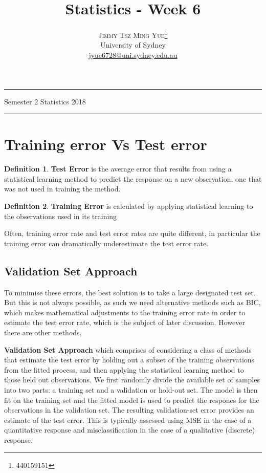 \documentclass[twoside]{article}
\title{\vspace{-15mm}\fontsize{24pt}{10pt}\selectfont\textbf{Statistics - Week 6}} %
\author{
\large
\textsc{Jimmy Tsz Ming Yue}\thanks{440159151}\\[2mm] %
\normalsize University of Sydney \\ %
\normalsize \href{mailto:jyue6728@uni.sydney.edu.au}{jyue6728@uni.sydney.edu.au} %
\vspace{-5mm}
}
\date{}
\theoremstyle{definition}
\theoremstyle{definition}
\newtheorem*{proof1}{Definition}
\newenvironment{ddef}{\begin{dBox}\begin{proof1}}{\hfill{\scriptsize}\end{proof1}\end{dBox}}
\begin{document}


\maketitle %

\thispagestyle{fancy} %
\hrule \smallskip

\noindent Semester 2 \quad Statistics \hspace{10.5
cm} 2018
\smallskip
\hrule
\smallskip
\tableofcontents
\section{Training error Vs Test error}

\begin{ddef}
	\textbf{Test Error} is the average error that results from using a statistical learning method to predict the response on a new observation, one that was not used in training the method.
\end{ddef}

\begin{ddef}
	\textbf{Training Error} is calculated by applying statistical learning to the observations used in its training
\end{ddef}

Often, training error rate and test error rates are quite different, in particular the training error can dramatically underestimate the test error rate.  
\subsection{Validation Set Approach}
To minimise these errors, the best solution is to take a large designated test set. But this is not always possible, as such we need alternative methods such as BIC, which makes mathematical adjustments to the training error rate in order to estimate the test error rate, which is the subject of later discussion. However there are other methods, 
\begin{cBox}
	\textbf{Validation Set Approach}
	which comprises of considering a class of methods that estimate the test error by holding out a subset of the training observations from the fitted process, and then applying the statistical learning method to those held out observations. We first randomly divide the available set of samples into two parts: a training set and a validation or hold-out set. The model is then fit on the training set and the fitted model is used to predict the respones for the observations in the validation set. The resulting validation-set error provides an estimate of the test error. This is typically assessed using MSE in the case of a quantitative response and misclassification in the case of a qualitative (discrete) response.
\end{cBox}
\end{document}
